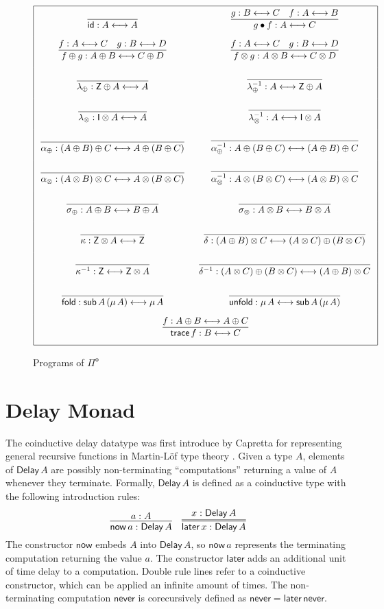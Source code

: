 \documentclass[runningheads]{llncs}
\newcommand{\Pio}{$\mathsf{\Pi}^{\mathsf{o}}$}
\newcommand{\id}{\mathsf{id}}
\newcommand{\lr}{\longleftrightarrow}
\newcommand{\fold}{\mathsf{fold}}
\newcommand{\unfold}{\mathsf{unfold}}
\newcommand{\sub}{\mathsf{sub}}
\newcommand{\trace}{\mathsf{trace}}
\newcommand{\Z}{\mathsf{Z}}
\newcommand{\I}{\mathsf{I}}
\newcommand{\Delay}{\mathsf{Delay}\,}
\newcommand{\now}{\mathsf{now}}
\newcommand{\later}{\mathsf{later}}
\newcommand{\never}{\mathsf{never}}
\begin{document}
\begin{figure}
\[
\arraycolsep=8pt\def\arraystretch{2.8}
\begin{array}{|cc|}
\hline
\infer{\id : A \lr A}{}
& \infer{g \bullet f : A \lr C}{g : B \lr C & f : A \lr B} \\
\infer{f \oplus g : A \oplus B \lr C \oplus D}{f : A \lr C & g : B \lr D} 
& \infer{f \otimes g : A \otimes B \lr C \otimes D}{f : A \lr C & g : B \lr D} \\
\infer{\lambda_{\oplus} : \Z \oplus A \lr A}{}
& \infer{\lambda_{\oplus}^{-1} : A \lr \Z \oplus A}{} \\
\infer{\lambda_{\otimes} : \I \otimes A \lr A}{}
& \infer{\lambda_{\otimes}^{-1} : A \lr \I \otimes A}{} \\
\infer{\alpha_{\oplus} : (A \oplus B) \oplus C \lr A \oplus (B \oplus C)}{}
& \infer{\alpha_{\oplus}^{-1} : A \oplus (B \oplus C) \lr (A \oplus B) \oplus C}{} \\
\infer{\alpha_{\otimes} : (A \otimes B) \otimes C \lr A \otimes (B \otimes C)}{}
& \infer{\alpha_{\otimes}^{-1} : A \otimes (B \otimes C) \lr (A \otimes B) \otimes C}{} \\
\infer{\sigma_{\oplus} : A \oplus B \lr B \oplus A}{}
& \infer{\sigma_{\otimes} : A \otimes B \lr B \otimes A}{} \\
\infer{\kappa : \Z \otimes A \lr \Z}{} 
& \infer{\delta : (A \oplus B) \otimes C \lr (A \otimes C) \oplus (B \otimes C)}{} \\
\infer{\kappa^{-1} : \Z \lr \Z \otimes A}{}
& \infer{\delta^{-1} : (A \otimes C) \oplus (B \otimes C)  \lr (A \oplus B) \otimes C}{} \\
\infer{\fold : \sub \, A \, (\mu \,A) \lr \mu \,A}{} 
& \infer{\unfold : \mu\,A \lr \sub \, A \, (\mu \,A)}{} \\
\multicolumn{2}{|c|}{\infer{\trace \,f: B \lr C}{f : A \oplus B \lr A \oplus C}} \\
\hline
\end{array}
\]
\caption{Programs of \Pio}
\label{fig:programs}
\end{figure}

\section{Delay Monad}\label{sec:delay}

The coinductive delay datatype was first introduce by Capretta for
representing general recursive functions in Martin-L\"of type theory
\cite{Capretta05}.  Given a type $A$, elements of $\Delay A$ are
possibly non-terminating ``computations'' returning a value of $A$
whenever they terminate. Formally, $\Delay A$ is defined as a
coinductive type with the following introduction rules:
\[
\infer{\now\,a : \Delay A}{a : A}
\quad
\infer={\later\,x : \Delay A}{x : \Delay A}
\]
The constructor $\now$ embeds $A$ into $\Delay A$, so $\now\,a$
represents the terminating computation returning the value $a$. The
constructor $\later$ adds an additional unit of time delay to a
computation. Double rule lines refer to a coinductive constructor,
which can be applied an infinite amount of times.
The non-terminating computation $\never$
is corecursively defined as $\never = \later \,\never$.
\end{document}
